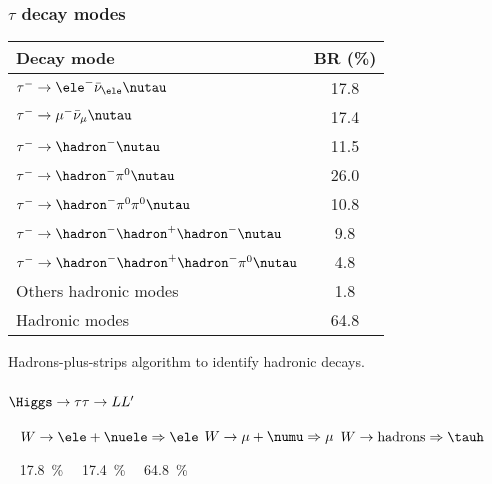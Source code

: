 \begin{frame}
\frametitle{$\tau$ decay modes}%
\begin{center}
\begin{tabular}{lc}
\toprule
Decay mode & BR (\%)\\
\midrule
$\tau^-\to \ele^-\bar{\nu}_\ele\nutau$ & \num{17.8} \\
$\tau^-\to \mu^-\bar{\nu}_\mu\nutau$ & \num{17.4} \\
\midrule
$\tau^-\to \hadron^- \nutau$ & \num{11.5} \\
$\tau^-\to \hadron^- \pi^0 \nutau$ & \num{26.0} \\
$\tau^-\to \hadron^- \pi^0\pi^0 \nutau$ & \num{10.8} \\
$\tau^-\to \hadron^- \hadron^+\hadron^- \nutau$ & \num{9.8} \\
$\tau^-\to \hadron^- \hadron^+\hadron^-\pi^0\nutau$ & \num{4.8} \\
Others hadronic modes & \num{1.8} \\
Hadronic modes & \num{64.8} \\
\bottomrule
\end{tabular}
\bigskip
\manip Hadrons-plus-strips algorithm to identify hadronic decays.
\end{center}
\end{frame}

\begin{frame}
\frametitle{$\Higgs\to\tau\tau\to LL'$}
\begin{center}


\vspace{.2\textheight}

~\hfill
$W\to\ele+\nuele\Rightarrow\ele$%
\hfill
$W\to\mu+\numu\Rightarrow\mu$%
\hfill
$W\to \text{hadrons}\Rightarrow\tauh$%
\hfill
~

~\hfill
\SI{17.8}{\%}~~
\hfill
\SI{17.4}{\%}
\hfill
~~\SI{64.8}{\%}
\hfill
~
\end{center}
\end{frame}

